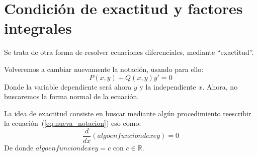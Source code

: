 \newpage
\chapter{Condición de exactitud y factores integrales}
Se trata de otra forma de resolver ecuaciones diferenciales, mediante ``exactitud''.

\begin{notacion}
    Volveremos a cambiar nuevamente la notación, usando para ello:
    \begin{equation}\label{eq:nueva_notacion}
        P(x,y) + Q(x,y)y' = 0
    \end{equation}
    Donde la variable dependiente será ahora $y$ y la independiente $x$. Ahora, no buscaremos la forma normal de la ecuación.
\end{notacion}

La idea de exactitud consiste en buscar mediante algún procedimiento reescribir la ecuación~(\ref{eq:nueva_notacion}) eso como:
\begin{equation*}
    \dfrac{d}{dx}(algo en funcion de x e y) = 0
\end{equation*}
De donde $algo en funcion de x e y =c$ con $c\in \mathbb{R}$.

